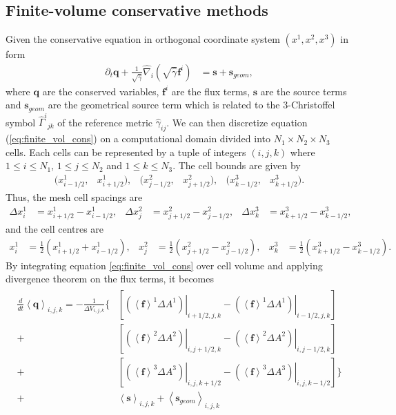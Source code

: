\subsection{Finite-volume conservative methods}
Given the conservative equation in orthogonal coordinate system $(x^1, x^2, x^3)$ in form
\begin{align}\label{eq:finite_vol_cons}
    \partial_t \mathbf{q} + \frac{1}{\sqrt{\hat{\gamma}}}\hat{\nabla}_i \left( \sqrt{\hat{\gamma}} \mathbf{f}^i \right)
    &= \mathbf{s} + \mathbf{s}_{geom},
\end{align}
where $\mathbf{q}$ are the conserved variables,
$\mathbf{f}^i$ are the flux terms, $\mathbf{s}$ are the source terms
and $\mathbf{s}_{geom}$ are the geometrical source term which is related to the 3-Christoffel symbol
$\hat{\Gamma}^i{}_{jk}$ of the reference metric $\hat{\gamma}_{ij}$.
We can then discretize equation (\ref{eq:finite_vol_cons}) on a computational domain divided into $N_1 \times N_2 \times N_3$ cells.
Each cells can be represented by a tuple of integers $(i,j,k)$ where $1 \leq i \leq N_1$, $1 \leq j \leq N_2$ and $1 \leq k \leq N_3$.
The cell bounds are given by
\begin{align}
    (x^1_{i-1/2}, &x^1_{i+1/2}), & (x^2_{j-1/2}, &x^2_{j+1/2}), & (x^3_{k-1/2}, &x^3_{k+1/2}).
\end{align}
Thus, the mesh cell spacings are 
\begin{align}
    \Delta x^1_i &= x^1_{i+1/2} - x^1_{i-1/2}, & \Delta x^2_j &= x^2_{j+1/2}- x^2_{j-1/2}, & \Delta x^3_k &= x^3_{k+1/2} - x^3_{k-1/2},
\end{align}
and the cell centres are
\begin{align}
    x^1_i &= \frac{1}{2} \left(x^1_{i+1/2} + x^1_{i-1/2}\right), & x^2_j &= \frac{1}{2} \left( x^2_{j+1/2}- x^2_{j-1/2} \right), 
    & x^3_k &= \frac{1}{2} \left( x^3_{k+1/2} - x^3_{k-1/2} \right).
\end{align}
By integrating equation \ref{eq:finite_vol_cons} over cell volume and applying divergence theorem on the flux terms,
it becomes
\begin{align}
    \begin{split}
    \frac{d}{dt} \left\langle \mathbf{q} \right\rangle_{i,j,k} = - \frac{1}{\Delta V_{i,j,k}} \bigg\{ &\left[
    \left. \left( \left\langle \mathbf{f} \right\rangle^1 \Delta A^1 \right) \right|_{i+1/2,j,k} -
    \left. \left( \left\langle \mathbf{f} \right\rangle^1 \Delta A^1 \right) \right|_{i-1/2,j,k} \right] \\
    + &\left[
    \left. \left( \left\langle \mathbf{f} \right\rangle^2 \Delta A^2 \right) \right|_{i,j+1/2,k} -
    \left. \left( \left\langle \mathbf{f} \right\rangle^2 \Delta A^2 \right) \right|_{i,j-1/2,k} \right] \\
    + &\left[
    \left. \left( \left\langle \mathbf{f} \right\rangle^3 \Delta A^3 \right) \right|_{i,j,k+1/2} -
    \left. \left( \left\langle \mathbf{f} \right\rangle^3 \Delta A^3 \right) \right|_{i,j,k-1/2} \right] \bigg\} \\
    + &\left\langle \mathbf{s} \right\rangle_{i,j,k}
    + \left\langle \mathbf{s}_{geom} \right\rangle_{i,j,k}
    \end{split}
\end{align}
